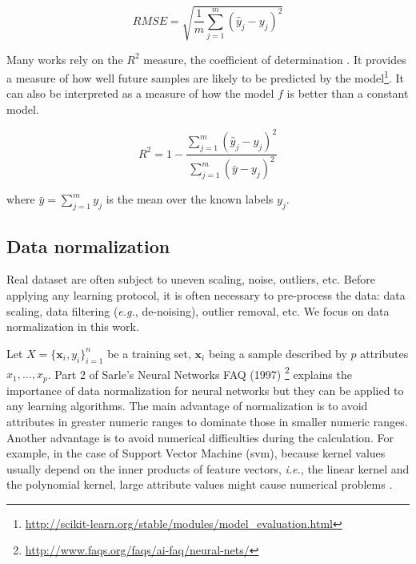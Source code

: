 \begin{equation}
RMSE = \sqrt{\frac{1}{m} \sum_{j=1}^m(\hat{y}_j-y_j)^2}
\end{equation}

Many works rely on the $R^2$ measure, the coefficient of determination \cite{Nagelkerke1991}. It provides a measure of how well future samples are likely to be predicted by the model\footnote{\url{http://scikit-learn.org/stable/modules/model_evaluation.html}}. It can also be interpreted as a measure of how the model $f$ is better than a constant model.

\begin{equation}
R^2 = 1- \frac{\sum_{j=1}^m (\hat{y}_j-y_j)^2}{\sum_{j=1}^m (\bar{y}-y_j)^2}
\end{equation}

\noindent where $\bar{y} = \sum_{j=1}^m y_j$ is the mean over the known labels $y_j$.


\subsection{Data normalization}
\label{sec:data_normalization}
Real dataset are often subject to uneven scaling, noise, outliers, etc. Before applying any learning protocol, it is often necessary to pre-process the data: data scaling, data filtering (\textit{e.g.}, de-noising), outlier removal, etc. We focus on data normalization in this work.

Let $X=\{\textbf{x}_i,y_i\}_{i=1}^n$ be a training set, $\textbf{x}_i$ being a sample described by $p$ attributes $x_1, \ldots, x_p$. Part 2 of Sarle's Neural Networks FAQ (1997) \footnote{\url{http://www.faqs.org/faqs/ai-faq/neural-nets/}} explains the importance of data normalization for neural networks but they can be applied to any learning algorithms. The main advantage of normalization is to avoid attributes in greater numeric ranges to dominate those in smaller numeric ranges. Another advantage is to avoid numerical difficulties during the calculation. For example, in the case of Support Vector Machine ({\sc svm}), because kernel values usually depend on the inner products of feature vectors, \textit{i.e.}, the linear kernel and the polynomial kernel, large attribute values might cause numerical problems \cite{Hsu2008}. 

